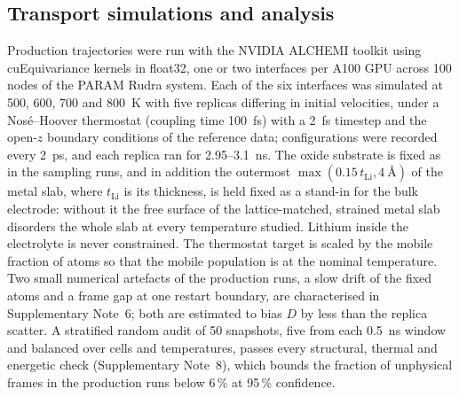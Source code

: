 \documentclass[11pt]{article}
\begin{document}
\subsection{Transport simulations and analysis}
Production trajectories were run with the NVIDIA ALCHEMI
toolkit\citep{alchemi} using cuEquivariance kernels in float32, one or two
interfaces per A100 GPU across 100 nodes of the PARAM Rudra system. Each of the
six interfaces was simulated at 500, 600, 700 and 800~K with five replicas
differing in initial velocities, under a Nos\'e--Hoover
thermostat\citep{Nose1984,Hoover1985} (coupling time 100~fs) with a 2~fs timestep
and the open-$z$ boundary conditions of the reference data; configurations were
recorded every 2~ps, and each replica ran for 2.95--3.1~ns. The oxide substrate
is fixed as in the sampling runs, and in addition the outermost
$\max(0.15\,t_{\mathrm{Li}},4~\text{\AA})$ of the metal slab, where
$t_{\mathrm{Li}}$ is its thickness, is held fixed as a stand-in for the bulk
electrode: without it the free surface of the lattice-matched, strained metal
slab disorders the whole slab at every temperature studied. Lithium inside the
electrolyte is never constrained. The thermostat target is scaled by the mobile
fraction of atoms so that the mobile population is at the nominal temperature.
Two small numerical artefacts of the production runs, a slow drift of the
fixed atoms and a frame gap at one restart boundary, are characterised in
Supplementary Note~6; both are estimated to bias $D$ by less than the replica
scatter. A stratified random audit of 50 snapshots, five from each 0.5~ns
window and balanced over cells and temperatures, passes every structural,
thermal and energetic check (Supplementary Note~8), which bounds the fraction
of unphysical frames in the production runs below 6\,\% at 95\,\% confidence.
\end{document}
